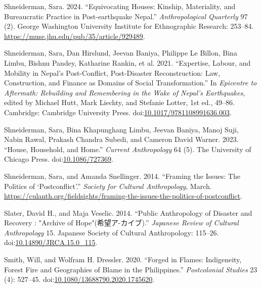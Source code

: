 \documentclass[
]{article}
\newlength{\cslhangindent}
\newenvironment{CSLReferences}[2] %
 {\begin{list}{}{%
  \setlength{\itemindent}{0pt}
  \setlength{\leftmargin}{0pt}
  \setlength{\parsep}{0pt}
  \ifodd #1
   \setlength{\leftmargin}{\cslhangindent}
   \setlength{\itemindent}{-1\cslhangindent}
  \fi
  \setlength{\itemsep}{#2\baselineskip}}}
 {\end{list}}
\begin{document}
\begin{CSLReferences}{1}{0}
Shneiderman, Sara. 2024. {``Equivocating {Houses}: {Kinship}, {Materiality}, and {Bureaucratic Practice} in {Post-earthquake Nepal}.''} \emph{Anthropological Quarterly} 97 (2). George Washington University Institute for Ethnographic Research: 253--84. \url{https://muse.jhu.edu/pub/35/article/929489}.

Shneiderman, Sara, Dan Hirslund, Jeevan Baniya, Philippe Le Billon, Bina Limbu, Bishnu Pandey, Katharine Rankin, et al. 2021. {``Expertise, {Labour}, and {Mobility} in {Nepal}'s {Post-Conflict}, {Post-Disaster Reconstruction}: {Law}, {Construction}, and {Finance} as {Domains} of {Social Transformation}.''} In \emph{Epicentre to {Aftermath}: {Rebuilding} and {Remembering} in the {Wake} of {Nepal}'s {Earthquakes}}, edited by Michael Hutt, Mark Liechty, and Stefanie Lotter, 1st ed., 49--86. Cambridge: Cambridge University Press. doi:\href{https://doi.org/10.1017/9781108991636.003}{10.1017/9781108991636.003}.

Shneiderman, Sara, Bina Khapunghang Limbu, Jeevan Baniya, Manoj Suji, Nabin Rawal, Prakash Chandra Subedi, and Cameron David Warner. 2023. {``House, {Household}, and {Home}.''} \emph{Current Anthropology} 64 (5). The University of Chicago Press. doi:\href{https://doi.org/10.1086/727369}{10.1086/727369}.

Shneiderman, Sara, and Amanda Snellinger. 2014. {``Framing the {Issues}: {The Politics} of {`{Postconflict}'}.''} \emph{Society for Cultural Anthropology}, March. \url{https://culanth.org/fieldsights/framing-the-issues-the-politics-of-postconflict}.

Slater, David H., and Maja Veselic. 2014. {``Public {Anthropology} of {Disaster} and {Recovery} : "{Archive} of {Hope}"(希望ア-カイブ).''} \emph{Japanese Review of Cultural Anthropology} 15. Japanese Society of Cultural Anthropology: 115--26. doi:\href{https://doi.org/10.14890/JRCA.15.0_115}{10.14890/JRCA.15.0\_115}.

Smith, Will, and Wolfram H. Dressler. 2020. {``Forged in Flames: Indigeneity, Forest Fire and Geographies of Blame in the {Philippines}.''} \emph{Postcolonial Studies} 23 (4): 527--45. doi:\href{https://doi.org/10.1080/13688790.2020.1745620}{10.1080/13688790.2020.1745620}.


\end{CSLReferences}
\end{document}
